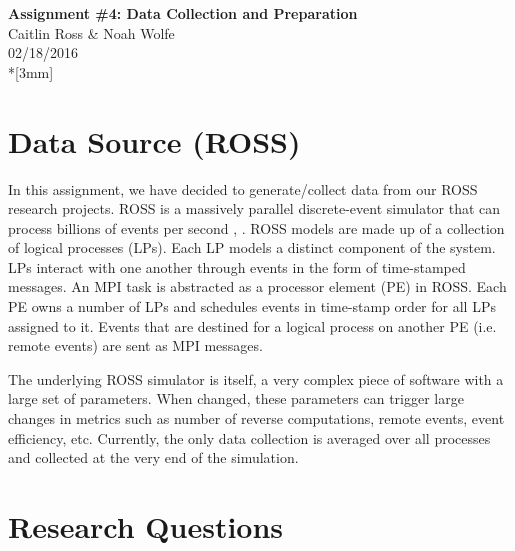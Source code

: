 \documentclass[12pt]{article}
\begin{document}
\thispagestyle{empty}
\begin{center}
{\Large\bf Assignment \#4: Data Collection and Preparation}
\vspace{3mm}
\\Caitlin Ross \& Noah Wolfe
\\02/18/2016
\\*[3mm]
\end{center}
\section{Data Source (ROSS)}
In this assignment, we have decided to generate/collect data from our ROSS research projects. 
ROSS is a massively parallel discrete-event simulator that
can process billions of events per second \cite{Holder}, \cite{Bauer}. ROSS
models are made up of a collection of logical processes (LPs).
Each LP models a distinct component of the system. LPs
interact with one another through events in the form of time-stamped messages. An MPI task is abstracted as a processor
element (PE) in ROSS. Each PE owns a number of LPs and
schedules events in time-stamp order for all LPs assigned to
it. Events that are destined for a logical process on another
PE (i.e. remote events) are sent as MPI messages. 

The underlying ROSS simulator is itself, a very complex piece of software with a large set of parameters. When changed, these parameters can trigger large changes in metrics such as number of reverse computations, remote events, event efficiency, etc. Currently, the only data collection is averaged over all processes and collected at the very end of the simulation. 

\section{Research Questions}
\end{document}
